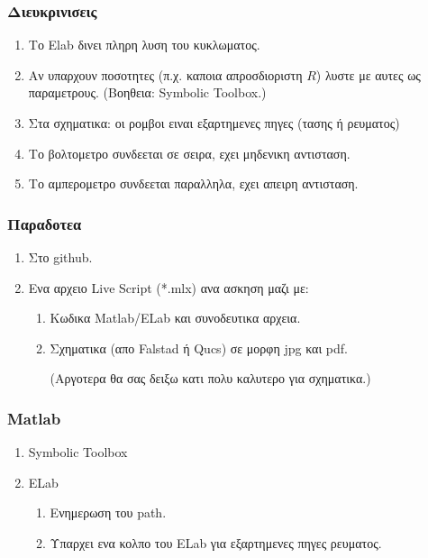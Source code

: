 \documentclass[xcolor={dvipsnames},t]{beamer}
\begin{document}
\begin{frame}
\frametitle{Διευκρινισεις}

\begin{enumerate}

\pause\item Το {\latintext  Elab} δινει πληρη λυση του κυκλωματος.

\pause\item Αν υπαρχουν ποσοτητες (π.χ. καποια απροσδιοριστη $R$) λυστε με αυτες ως παραμετρους.  
(Βοηθεια:  {\latintext  Symbolic Toolbox}.)

\pause\item Στα σχηματικα: οι ρομβοι ειναι εξαρτημενες πηγες (τασης ή ρευματος)

\pause\item Το βολτομετρο συνδεεται σε σειρα, εχει μηδενικη αντισταση.

\pause\item Το αμπερομετρο συνδεεται παραλληλα, εχει απειρη αντισταση.

\end{enumerate}

\end{frame}
\begin{frame}
\frametitle{Παραδοτεα}

\begin{enumerate}

\pause\item Στο {\latintext  github}.
\pause\item Ενα αρχειο {\latintext  Live Script (*.mlx)} ανα ασκηση μαζι με: 

\begin{enumerate}
\pause\item Κωδικα {\latintext  Matlab/ELab} και συνοδευτικα αρχεια. 
\pause\item Σχηματικα (απο {\latintext  Falstad} ή {\latintext  Qucs}) σε μορφη 
{\latintext  jpg} και {\latintext pdf}.

\pause (Αργοτερα θα σας δειξω κατι πολυ καλυτερο για σχηματικα.)

\end{enumerate}
\end{enumerate}

\end{frame}
\begin{frame}
\frametitle{{\latintext  Matlab}}

\begin{enumerate}
\pause\item  {\latintext  Symbolic Toolbox}
\pause\item  {\latintext  ELab}
\begin{enumerate}
\pause\item Ενημερωση του {\latintext  path}. 
\pause\item Υπαρχει ενα κολπο του {\latintext  ELab} για εξαρτημενες πηγες ρευματος.
\end{enumerate}
\end{enumerate}

\end{frame}
\end{document}
